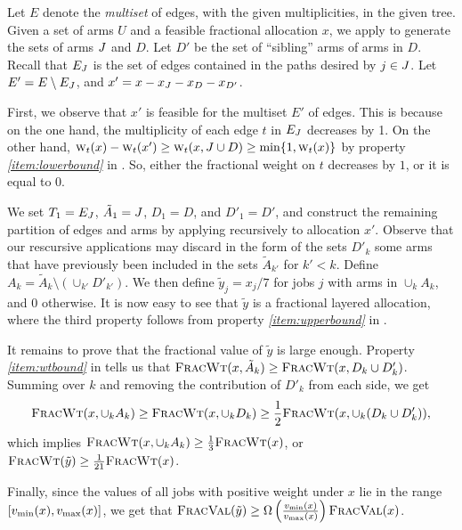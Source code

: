 \begin{proofof}{}
  Let $E$ denote the {\em multiset} of edges, with the given
  multiplicities, in the given tree. Given a set of arms $U$ and a
  feasible fractional allocation $x$, we apply  to
  generate the sets of arms $J$ and $D$.  Let $D'$ be the set of
  ``sibling'' arms of arms in $D$. Recall that $E_J$ is the set
  of edges contained in the paths desired by $j\in J$. Let
  $E'=E\setminus E_J$, and $x' = x-x_J-x_D-x_{D'}$.

  First, we observe that $x'$ is feasible for the multiset $E'$ of
  edges. This is because on the one hand, the multiplicity of each
  edge $t$ in $E_J$ decreases by 1. On the other hand,
  $\textsc{w}_{t}(x)-\textsc{w}_{t}(x')\ge \textsc{w}_{t}(x,J\cup D)\ge \min\{1, \textsc{w}_{t}(x)\}$ by
  property {\it \ref{item:lowerbound}} in . So,
  either the fractional weight on $t$ decreases by $1$, or it is equal
  to $0$.

  We set $T_1 = E_J$, $\tilde{A}_1 = J$, $D_1=D$, and
  $D'_1=D'$, and construct the remaining partition of edges and arms
  by applying  recursively to allocation
  $x'$. Observe that our rescursive applications may discard in the
  form of the sets $D'_k$ some arms that have previously been included
  in the sets $\tilde{A}_{k'}$ for $k'<k$. Define
  $A_k = \tilde{A}_k\setminus (\cup_{k'} D'_{k'})$. We then define
  $\tilde{y}_j = x_j/7$ for jobs $j$ with arms in $\cup_k A_k$, and
  $0$ otherwise. It is now easy to see that $\tilde{y}$ is a
  fractional layered allocation, where the third property follows from
  property {\it \ref{item:upperbound}} in .

  It remains to prove that the fractional value of $\tilde{y}$ is
  large enough. Property {\it \ref{item:wtbound}} in
   tells us that
  ${\normalfont\textsc{FracWt}}(x, \tilde{A}_k)\ge {\normalfont\textsc{FracWt}}(x, D_k\cup D'_k)$. Summing over $k$
  and removing the contribution of $D'_k$ from each side, we get
  \[{\normalfont\textsc{FracWt}}(x,\cup_k A_k) \ge {\normalfont\textsc{FracWt}}(x,\cup_k D_k) \ge \frac12{\normalfont\textsc{FracWt}}(x,\cup_k
  (D_k\cup D'_k)),\] 
  which implies ${\normalfont\textsc{FracWt}}(x,\cup_k A_k)\ge \frac 13 {\normalfont\textsc{FracWt}}(x)$, or
  ${\normalfont\textsc{FracWt}}(\tilde{y})\ge \frac 1{21} {\normalfont\textsc{FracWt}}(x)$.

  Finally, since the values of all jobs with positive weight under $x$
  lie in the range $[v_{\min}(x),v_{\max}(x)]$, we get that
  ${\normalfont\textsc{FracVal}}(\tilde{y})\ge \Omega\left(\frac{v_{\min}(x)}{v_{\max}(x)}\right){\normalfont\textsc{FracVal}}(x)$.
\end{proofof}

